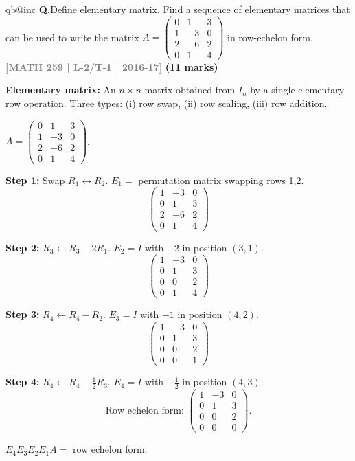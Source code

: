 \documentclass[12pt,a3paper]{article}
\makeatletter
\newcommand{\yr}[1]{\hfill\textcolor{gray}{\small\textbf{[#1]}}}
\newcommand{\mk}[1]{\textcolor{orange!70!black}{\small\textbf{(#1 marks)}}}
\newcounter{qnum}
\newcommand{\Q}[1]{%
  \csname qb@inc\endcsname
  \needspace{4\baselineskip}
  \refstepcounter{qnum}
  \vspace{6pt}
  \noindent\textbf{Q\theqnum.}\enspace #1\par
}
\makeatother
\begin{document}
\Q{Define elementary matrix. Find a sequence of elementary matrices that can be used to write the matrix $A = \begin{pmatrix} 0 & 1 & 3 \\ 1 & -3 & 0 \\ 2 & -6 & 2 \\ 0 & 1 & 4 \end{pmatrix}$ in row-echelon form.
\yr{MATH 259 | L-2/T-1 | 2016-17} \mk{11}}

\begin{tcolorbox}[enhanced,breakable,
  colback=cB!4,colframe=cB,boxrule=0.8pt,arc=5pt,
  title={\textbf{Answer --- Elementary Matrices to Row-Echelon Form}},
  fonttitle=\bfseries\color{white},colbacktitle=cB]

\textbf{Elementary matrix:} An $n\times n$ matrix obtained from $I_n$ by a single elementary row operation. Three types: (i) row swap, (ii) row scaling, (iii) row addition.

\medskip
$A=\begin{pmatrix}0&1&3\\1&-3&0\\2&-6&2\\0&1&4\end{pmatrix}$.

\textbf{Step 1:} Swap $R_1\leftrightarrow R_2$. $E_1=$ permutation matrix swapping rows 1,2.
\[
\begin{pmatrix}1&-3&0\\0&1&3\\2&-6&2\\0&1&4\end{pmatrix}
\]

\textbf{Step 2:} $R_3\leftarrow R_3-2R_1$. $E_2=I$ with $-2$ in position $(3,1)$.
\[
\begin{pmatrix}1&-3&0\\0&1&3\\0&0&2\\0&1&4\end{pmatrix}
\]

\textbf{Step 3:} $R_4\leftarrow R_4-R_2$. $E_3=I$ with $-1$ in position $(4,2)$.
\[
\begin{pmatrix}1&-3&0\\0&1&3\\0&0&2\\0&0&1\end{pmatrix}
\]

\textbf{Step 4:} $R_4\leftarrow R_4-\frac{1}{2}R_3$. $E_4=I$ with $-\frac{1}{2}$ in position $(4,3)$.
\[
\text{Row echelon form: }\begin{pmatrix}1&-3&0\\0&1&3\\0&0&2\\0&0&0\end{pmatrix}.
\]

$E_4 E_3 E_2 E_1 A = $ row echelon form.

\end{tcolorbox}
\end{document}
